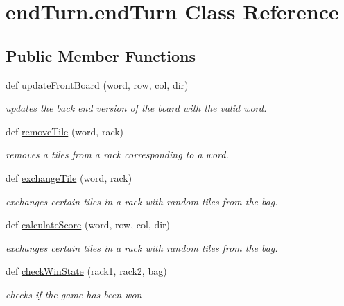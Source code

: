 \hypertarget{classend_turn_1_1end_turn}{}\section{end\+Turn.\+end\+Turn Class Reference}
\label{classend_turn_1_1end_turn}
\subsection*{Public Member Functions}
\begin{DoxyCompactItemize}
\item 
def \hyperlink{classend_turn_1_1end_turn_a997ab21240dd3b52b2c9f19d5c3beb30}{update\+Front\+Board} (word, row, col, dir)
\begin{DoxyCompactList}\small\item\em updates the back end version of the board with the valid word. \end{DoxyCompactList}\item 
def \hyperlink{classend_turn_1_1end_turn_a05d19f3d8632fb2f6c85f757845a8579}{remove\+Tile} (word, rack)
\begin{DoxyCompactList}\small\item\em removes a tiles from a rack corresponding to a word. \end{DoxyCompactList}\item 
def \hyperlink{classend_turn_1_1end_turn_ae7a71a01d8013087c36c72c438b93b67}{exchange\+Tile} (word, rack)
\begin{DoxyCompactList}\small\item\em exchanges certain tiles in a rack with random tiles from the bag. \end{DoxyCompactList}\item 
def \hyperlink{classend_turn_1_1end_turn_a1cfa4c1d439636ea82d00f31c1bb2f1f}{calculate\+Score} (word, row, col, dir)
\begin{DoxyCompactList}\small\item\em exchanges certain tiles in a rack with random tiles from the bag. \end{DoxyCompactList}\item 
def \hyperlink{classend_turn_1_1end_turn_a6390e7407b5d8a8744603ce54ce553b7}{check\+Win\+State} (rack1, rack2, bag)
\begin{DoxyCompactList}\small\item\em checks if the game has been won \end{DoxyCompactList}\end{DoxyCompactItemize}



